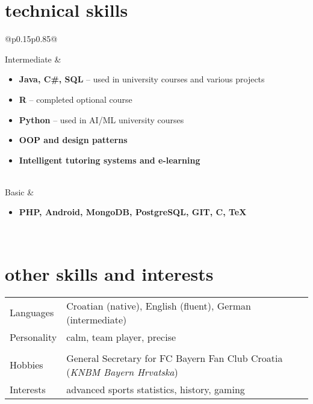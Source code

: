 \documentclass[a4paper]{article}
\makeatletter
\newlength{\tablewidth}
\newenvironment{skills}{%
\setlength{\tablewidth}{\linewidth}
\addtolength{\tablewidth}{-2\tabcolsep}
\begin{tabular}{@{}p{0.15\tablewidth}p{0.85\tablewidth}@{}}
}{%
\end{tabular}
}
\makeatother
\begin{document}
\section{technical skills}
\begin{skills}
    Intermediate &
    \begin{itemize}
        \item \textbf{Java, C\#, SQL} -- used in university courses and various projects
        \item \textbf{R} -- completed optional course
        \item \textbf{Python} -- used in AI/ML university courses
        \item \textbf{OOP and design patterns}
        \item \textbf{Intelligent tutoring systems and e-learning}
    \end{itemize} \\
    Basic &
    \begin{itemize}
        \item \textbf{PHP, Android, MongoDB, PostgreSQL, GIT, C, TeX}
    \end{itemize} \\
\end{skills}


\section{other skills and interests}
\begin{skills}
	Languages & Croatian (native), English (fluent), German (intermediate) \\
	Personality & calm, team player, precise \\
	\\
	Hobbies & General Secretary for  FC Bayern Fan Club Croatia (\textit{KNBM Bayern Hrvatska})\\
	Interests & advanced sports statistics, history, gaming \\
\end{skills}
\end{document}
